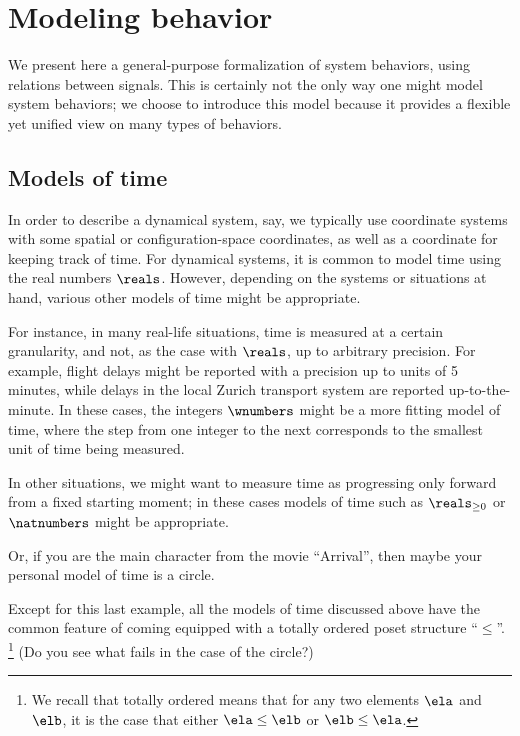 
\section{Modeling behavior}

We present here a general-purpose formalization of system behaviors, using relations between signals.
This is certainly not the only way one might model system behaviors; we choose to introduce this model because it provides a flexible yet unified view on many types of behaviors.

\subsection{Models of time}

In order to describe a dynamical system, say, we typically use coordinate systems with some spatial or configuration-space coordinates, as well as a coordinate for keeping track of time.
For dynamical systems, it is common to model time using the real numbers $\reals$.
However, depending on the systems or situations at hand, various other models of time might be appropriate.

For instance, in many real-life situations, time is measured at a certain granularity, and not, as the case with $\reals$, up to arbitrary precision.
For example, flight delays might be reported with a precision up to units of 5 minutes, while delays in the local Zurich transport system are reported up-to-the-minute.
In these cases, the integers $\wnumbers$ might be a more fitting model of time, where the step from one integer to the next corresponds to the smallest unit of time being measured.

In other situations, we might want to measure time as progressing only forward from a fixed starting moment; in these cases models of time such as $\reals_{\geq 0}$ or $\natnumbers$ might be appropriate.

Or, if you are the main character from the movie ``Arrival'', then maybe your personal model of time is a circle.


Except for this last example, all the models of time discussed above have the common feature of coming equipped with a totally ordered poset structure ``$\leq$''.
\footnote{We recall that totally ordered means that for any two elements $\ela$ and $\elb$, it is the case that either $\ela \leq \elb$ or $\elb \leq \ela$.}  (Do you see what fails in the case of the circle?)

